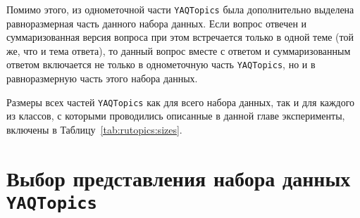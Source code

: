 Помимо этого, из однометочной части \texttt{YAQTopics} была дополнительно выделена равноразмерная часть данного набора данных. Если вопрос отвечен и суммаризованная версия вопроса при этом встречается только в одной теме (той же, что и тема ответа), то данный вопрос вместе с ответом и суммаризованным ответом включается не только в однометочную часть \texttt{YAQTopics}, но и в равноразмерную часть этого набора данных. 
 
Размеры всех частей \texttt{YAQTopics} как для всего набора данных, так и для каждого из классов, с которыми проводились описанные в данной главе эксперименты, включены в Таблицу~\ref{tab:rutopics:sizes}. 

\begin{table}[t]
\centering
{}
\caption{Размеры набора данных \texttt{YAQTopics} по классу и разбиению}
\label{tab:rutopics:sizes}
\end{table}


\section{Выбор представления набора данных \texttt{YAQTopics}}\label{rutopics:prepr} 

